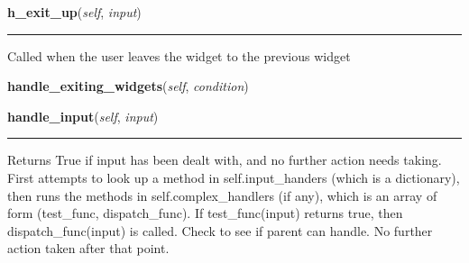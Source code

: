     \label{npyscreen:widget:InputHandler:h_exit_up}

    \vspace{0.5ex}

    \begin{boxedminipage}{\textwidth}

    \raggedright \textbf{h\_exit\_up}(\textit{self}, \textit{input})

    \vspace{-1.5ex}

    \rule{\textwidth}{0.5\fboxrule}
    Called when the user leaves the widget to the previous widget

    \vspace{1ex}

    \end{boxedminipage}

    \label{npyscreen:Form:Form:handle_exiting_widgets}
    
    \vspace{0.5ex}

    \begin{boxedminipage}{\textwidth}

    \raggedright \textbf{handle\_exiting\_widgets}(\textit{self}, \textit{condition})

    \end{boxedminipage}

    \label{npyscreen:widget:InputHandler:handle_input}

    \vspace{0.5ex}

    \begin{boxedminipage}{\textwidth}

    \raggedright \textbf{handle\_input}(\textit{self}, \textit{input})

    \vspace{-1.5ex}

    \rule{\textwidth}{0.5\fboxrule}
    Returns True if input has been dealt with, and no further action needs 
    taking. First attempts to look up a method in self.input\_handers 
    (which is a dictionary), then runs the methods in 
    self.complex\_handlers (if any), which is an array of form (test\_func,
    dispatch\_func). If test\_func(input) returns true, then 
    dispatch\_func(input) is called. Check to see if parent can handle. No 
    further action taken after that point.

    \vspace{1ex}

    \end{boxedminipage}

